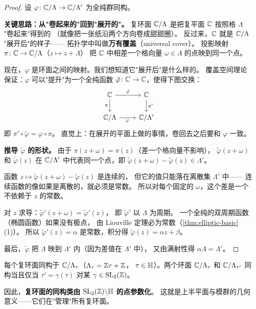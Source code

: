 \begin{proof}
设 $\varphi\colon \mathbb{C}/\Lambda \to \mathbb{C}/\Lambda'$ 为全纯群同构。

\textbf{关键思路：从"卷起来的"回到"展开的"。}
复环面 $\mathbb{C}/\Lambda$ 是把复平面 $\mathbb{C}$ 按照格 $\Lambda$ "卷起来"得到的
（就像把一张纸沿两个方向卷成甜甜圈）。
反过来，$\mathbb{C}$ 就是 $\mathbb{C}/\Lambda$ "展开后"的样子——
拓扑学中叫做\textbf{万有覆盖}（universal cover）。
投影映射 $\pi\colon \mathbb{C} \to \mathbb{C}/\Lambda$（$z \mapsto z + \Lambda$）
把 $\mathbb{C}$ 中相差一个格向量 $\omega \in \Lambda$ 的点映到同一个点。

现在，$\varphi$ 是环面之间的映射。我们想知道它"展开后"是什么样的。
覆盖空间理论保证：$\varphi$ 可以"提升"为一个全纯函数
$\tilde\varphi\colon \mathbb{C} \to \mathbb{C}$，使得下图交换：
\[
  \begin{tikzcd}
    \C \arrow[r, "\tilde\varphi"] \arrow[d, "\pi"'] & \C \arrow[d, "\pi'"] \\
    \C/\Lambda \arrow[r, "\varphi"'] & \C/\Lambda'
  \end{tikzcd}
\]
即 $\pi' \circ \tilde\varphi = \varphi \circ \pi$。
直觉上：在展开的平面上做的事情，卷回去之后要和 $\varphi$ 一致。

\textbf{推导 $\tilde\varphi$ 的形状。}
由于 $\pi(z + \omega) = \pi(z)$（差一个格向量不影响），
$\tilde\varphi(z + \omega)$ 和 $\tilde\varphi(z)$ 在 $\mathbb{C}/\Lambda'$
中代表同一个点，即
$\tilde\varphi(z + \omega) - \tilde\varphi(z) \in \Lambda'$。

函数 $z \mapsto \tilde\varphi(z + \omega) - \tilde\varphi(z)$ 是连续的，
但它的值只能落在离散集 $\Lambda'$ 中——
连续函数的像如果是离散的，就必须是常数。
所以对每个固定的 $\omega$，这个差是一个不依赖于 $z$ 的常数。

对 $z$ 求导：$\tilde\varphi'(z + \omega) = \tilde\varphi'(z)$，
即 $\tilde\varphi'$ 以 $\Lambda$ 为周期。
一个全纯的双周期函数（椭圆函数）如果没有极点，
由 Liouville 定理必为常数（\cref{thm:elliptic-basic}(1)）。
所以 $\tilde\varphi'(z) = \alpha$ 是常数，积分得 $\tilde\varphi(z) = \alpha z + \beta$。

最后，$\tilde\varphi$ 把 $\Lambda$ 映到 $\Lambda'$ 内（因为差值在 $\Lambda'$ 中），
又由满射性得 $\alpha\Lambda = \Lambda'$。
\end{proof}

\begin{corollary}
\label{cor:torus-tau}
每个复环面同构于 $\mathbb{C}/\Lambda_\tau$（$\Lambda_\tau = \mathbb{Z}\tau + \mathbb{Z}$，
$\tau \in \mathbb{H}$）。两个环面 $\mathbb{C}/\Lambda_\tau$ 和 $\mathbb{C}/\Lambda_{\tau'}$
同构当且仅当 $\tau' = \gamma(\tau)$ 对某 $\gamma \in \mathrm{SL}_2(\mathbb{Z})$。

因此，\textbf{复环面的同构类由 $\mathrm{SL}_2(\mathbb{Z}) \backslash \mathbb{H}$ 的点参数化}。
这就是上半平面与模群的几何意义——它们在"管理"所有复环面。
\end{corollary}

